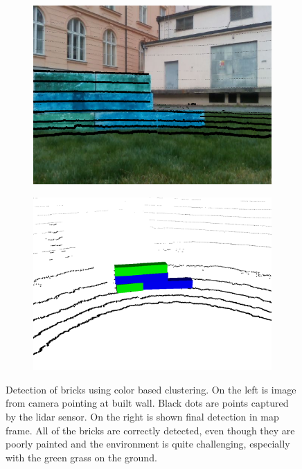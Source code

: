 \begin{figure}[H]
	
	\begin{subfigure}{0.49\textwidth}
		\centering
		\includegraphics[scale=0.19]{fig/colors_camera}
	\end{subfigure}
	\begin{subfigure}{0.49\textwidth}
		\centering
		\includegraphics[scale=0.18]{fig/colors_lidar}
	\end{subfigure}
	
	\caption[Colored pointcloud detections]{Detection of bricks using color based clustering. On the left is image from camera pointing at built wall. Black dots are points captured by the lidar sensor. On the right is shown final detection in map frame. All of the bricks are correctly detected, even though they are poorly painted and the environment is quite challenging, especially with the green grass on the ground.}
	\label{fig:colors}
\end{figure}

\newpage
